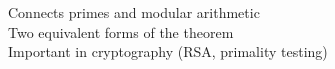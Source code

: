 \documentclass[preview]{standalone}
\begin{document}
Connects primes and modular arithmetic\\Two equivalent forms of the theorem\\Important in cryptography (RSA, primality testing)\\
\end{document}
